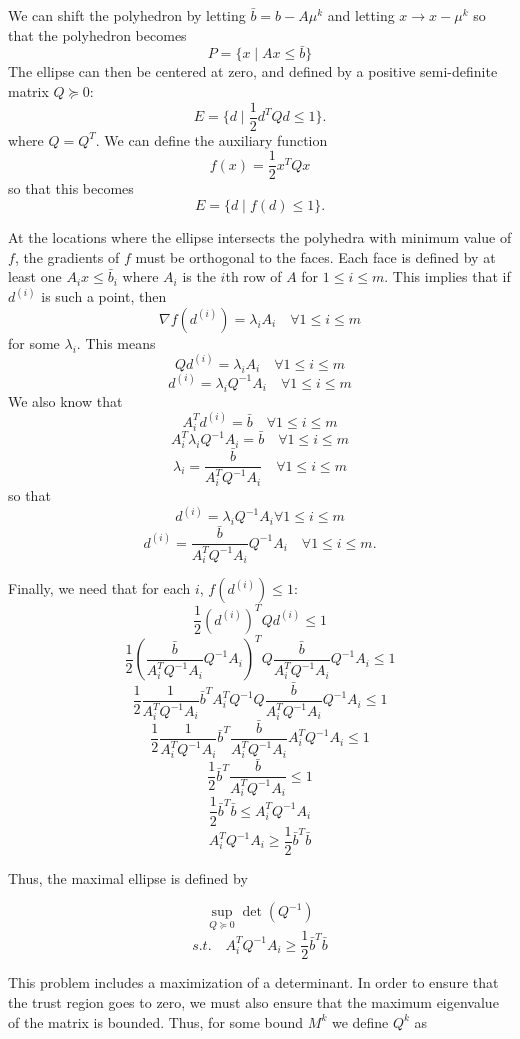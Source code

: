 \documentclass{article}
\begin{document}
We can shift the polyhedron by letting $\bar{b} = b - A\mu^{k}$ and letting $x \to x - \mu^{k}$ so that the polyhedron becomes
\[
P = \{ x \; | \;  Ax \le \bar{b} \}
\]
The ellipse can then be centered at zero, and defined by a positive semi-definite matrix $Q \succeq 0$:
\[
E = \{ d \; | \; \frac 1 2 d^T Q d \le 1 \}.
\]
where $Q = Q^T$.
We can define the auxiliary function 
\[
f(x) = \frac 1 2 x^T Q x
\]
so that this becomes
\[
E = \{ d \; | \; f(d) \le 1 \}.
\]


At the locations where the ellipse intersects the polyhedra with minimum value of $f$, the gradients of $f$ must be orthogonal to the faces.
Each face is defined by at least one $A_i x \le \bar{b}_i$ where $A_i$ is the $i$th row of $A$ for $1\le i \le m$.
This implies that if $d^{(i)}$ is such a point, then
\[
\nabla f(d^{(i)}) = \lambda_i A_i \quad \forall 1\le i\le m
\]
for some $\lambda_i$.
This means
\[
Q d^{(i)} = \lambda_i A_i \quad \forall 1\le i\le m
\]
\[
d^{(i)} = \lambda_i Q^{-1}A_i \quad \forall 1\le i\le m
\]
We also know that 
\[
A_i^T d^{(i)} = \bar{b} \quad \forall 1\le i\le m
\]
\[
A_i^T \lambda_i Q^{-1}A_i = \bar{b} \quad \forall 1\le i\le m
\]
\[
\lambda_i = \frac {\bar{b}}{A_i^T  Q^{-1}A_i} \quad \forall 1\le i\le m
\]
so that 
\[
d^{(i)} = \lambda_i Q^{-1}A_i \forall 1\le i\le m
\]
\[
d^{(i)} = \frac {\bar{b}}{A_i^T  Q^{-1}A_i}  Q^{-1}A_i \quad \forall 1\le i\le m.
\]

Finally, we need that for each $i$, $f(d^{(i)}) \le 1$:
\[
\frac 1 2 (d^{(i)})^{T} Q d^{(i)} \le 1
\]
\[
\frac 1 2 (\frac {\bar{b}}{A_i^T  Q^{-1}A_i}  Q^{-1}A_i)^{T} Q \frac {\bar{b}}{A_i^T  Q^{-1}A_i}  Q^{-1}A_i \le 1
\]
\[
\frac 1 2 \frac {1}{A_i^T  Q^{-1}A_i}  \bar{b}^T A_i^T Q^{-1} Q \frac {\bar{b}}{A_i^T  Q^{-1}A_i}  Q^{-1}A_i \le 1
\]
\[
\frac 1 2 \frac {1}{A_i^T  Q^{-1}A_i}  \bar{b}^T \frac {\bar{b}}{A_i^T  Q^{-1}A_i}  A_i^T Q^{-1}A_i \le 1
\]
\[
\frac 1 2 \bar{b}^T \frac {\bar{b}}{A_i^T  Q^{-1}A_i} \le 1
\]
\[
\frac 1 2 \bar{b}^T \bar{b}\le A_i^T  Q^{-1}A_i
\]
\[
A_i^T  Q^{-1}A_i \ge \frac 1 2 \bar{b}^T \bar{b}
\]

Thus, the maximal ellipse is defined by

\[
\sup_{Q \succeq 0} \det(Q^{-1})
\]
\[
s.t. \quad A_i^T Q^{-1} A_i \ge \frac 1 2 \bar{b}^T\bar{b}
\]


This problem includes a maximization of a determinant.
In order to ensure that the trust region goes to zero, we must also ensure that the maximum eigenvalue of the matrix is bounded.
Thus, for some bound $M^k$ we define $Q^k$ as
\end{document}
